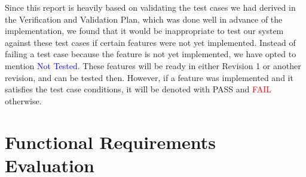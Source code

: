 \documentclass[12pt, titlepage]{article}
\begin{document}

\newpage

\tableofcontents

\listoftables %

\listoffigures %

\newpage


Since this report is heavily based on validating the test cases we had derived
in the Verification and Validation Plan, which was done well in advance of the
implementation, we found that it would be inappropriate to test our system
against these test cases if certain features were not yet implemented. Instead
of failing a test case because the feature is not yet implemented, we have opted
to mention \textcolor{blue}{Not Tested}. These features will be ready in either
Revision 1 or another revision, and can be tested then. However, if a feature
was implemented and it satisfies the test case conditions, it will be denoted
with \textcolor{OliveGreen}{PASS} and \textcolor{Red}{FAIL} otherwise.\\

\color{red}{NOTE: For all location detection related test cases, we acknowledge that  location information from users is only as accurate as 5 metres. While this may seem like a huge error while walking or biking, this does not make much of a difference when driving a car, and results in similar driving instructions and navigation.}

\color{black}

\newpage

\section{Functional Requirements Evaluation}
\end{document}
